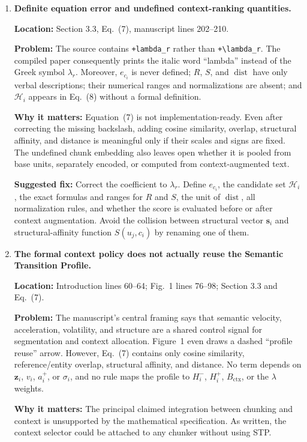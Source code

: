\documentclass[11pt]{article}
\newcommand{\location}[1]{\textbf{Location:} #1}
\newcommand{\problem}{\textbf{Problem:} }
\newcommand{\impact}{\textbf{Why it matters:} }
\newcommand{\fix}{\textbf{Suggested fix:} }
\begin{document}
\begin{enumerate}
  \item \textbf{Definite equation error and undefined context-ranking quantities.}

  \location{Section 3.3, Eq.~(7), manuscript lines 202--210.}

  \problem The source contains \texttt{+lambda\_r} rather than \verb|+\lambda_r|. The compiled paper consequently prints the italic word ``lambda'' instead of the Greek symbol $\lambda_r$. Moreover, $e_{c_i}$ is never defined; $R$, $S$, and $\operatorname{dist}$ have only verbal descriptions; their numerical ranges and normalizations are absent; and $\mathcal H_i$ appears in Eq.~(8) without a formal definition.

  \impact Equation~(7) is not implementation-ready. Even after correcting the missing backslash, adding cosine similarity, overlap, structural affinity, and distance is meaningful only if their scales and signs are fixed. The undefined chunk embedding also leaves open whether it is pooled from base units, separately encoded, or computed from context-augmented text.

  \fix Correct the coefficient to $\lambda_r$. Define $e_{c_i}$, the candidate set $\mathcal H_i$, the exact formulas and ranges for $R$ and $S$, the unit of $\operatorname{dist}$, all normalization rules, and whether the score is evaluated before or after context augmentation. Avoid the collision between structural vector $\mathbf{s}_i$ and structural-affinity function $S(u_j,c_i)$ by renaming one of them.

  \item \textbf{The formal context policy does not actually reuse the Semantic Transition Profile.}

  \location{Introduction lines 60--64; Fig.~1 lines 76--98; Section 3.3 and Eq.~(7).}

  \problem The manuscript's central framing says that semantic velocity, acceleration, volatility, and structure are a shared control signal for segmentation and context allocation. Figure~1 even draws a dashed ``profile reuse'' arrow. However, Eq.~(7) contains only cosine similarity, reference/entity overlap, structural affinity, and distance. No term depends on $\mathbf z_i$, $v_i$, $a_i^+$, or $\sigma_i$, and no rule maps the profile to $H_i^-$, $H_i^+$, $B_{\mathrm{ctx}}$, or the $\lambda$ weights.

  \impact The principal claimed integration between chunking and context is unsupported by the mathematical specification. As written, the context selector could be attached to any chunker without using STP.


\end{enumerate}
\end{document}
